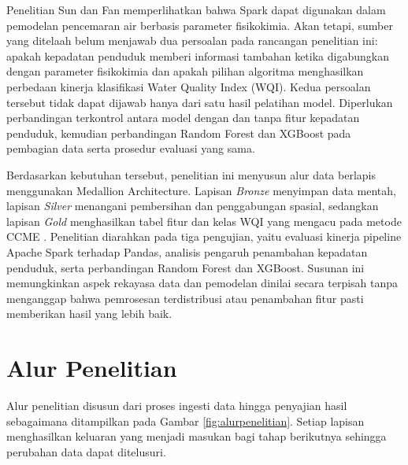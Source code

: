 Penelitian Sun dan Fan \cite{sun_combined_2022} memperlihatkan bahwa Spark dapat digunakan dalam pemodelan pencemaran air berbasis parameter fisikokimia. Akan tetapi, sumber yang ditelaah belum menjawab dua persoalan pada rancangan penelitian ini: apakah kepadatan penduduk memberi informasi tambahan ketika digabungkan dengan parameter fisikokimia dan apakah pilihan algoritma menghasilkan perbedaan kinerja klasifikasi Water Quality Index (WQI). Kedua persoalan tersebut tidak dapat dijawab hanya dari satu hasil pelatihan model. Diperlukan perbandingan terkontrol antara model dengan dan tanpa fitur kepadatan penduduk, kemudian perbandingan Random Forest dan XGBoost pada pembagian data serta prosedur evaluasi yang sama.

Berdasarkan kebutuhan tersebut, penelitian ini menyusun alur data berlapis menggunakan Medallion Architecture. Lapisan \textit{Bronze} menyimpan data mentah, lapisan \textit{Silver} menangani pembersihan dan penggabungan spasial, sedangkan lapisan \textit{Gold} menghasilkan tabel fitur dan kelas WQI yang mengacu pada metode CCME \cite{ccme_canadian_2007}. Penelitian diarahkan pada tiga pengujian, yaitu evaluasi kinerja pipeline Apache Spark terhadap Pandas, analisis pengaruh penambahan kepadatan penduduk, serta perbandingan Random Forest dan XGBoost. Susunan ini memungkinkan aspek rekayasa data dan pemodelan dinilai secara terpisah tanpa menganggap bahwa pemrosesan terdistribusi atau penambahan fitur pasti memberikan hasil yang lebih baik.

\section{Alur Penelitian}

Alur penelitian disusun dari proses ingesti data hingga penyajian hasil sebagaimana ditampilkan pada Gambar \ref{fig:alurpenelitian}. Setiap lapisan menghasilkan keluaran yang menjadi masukan bagi tahap berikutnya sehingga perubahan data dapat ditelusuri.

